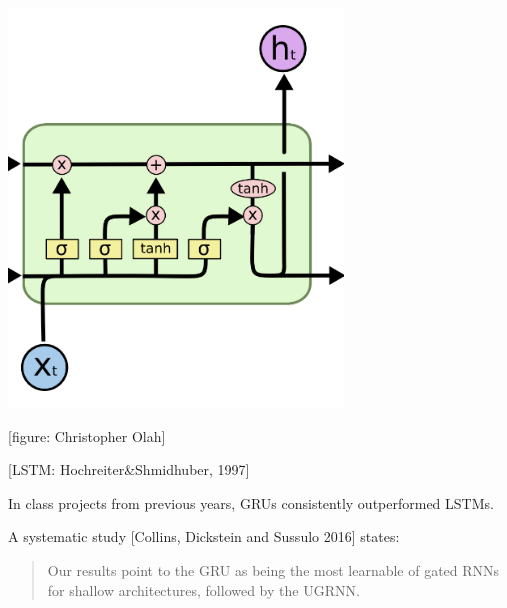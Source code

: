 {
\centerline{\includegraphics[width=3.5in]{../images/LSTM}}
\centerline{{\large [figure: Christopher Olah]}}

\centerline{\Large [LSTM: Hochreiter\&Shmidhuber, 1997]}


\vfill
In class projects from previous years, GRUs consistently outperformed LSTMs.

\vfill
A systematic study [Collins, Dickstein and Sussulo 2016] states:

\begin{quotation}
  Our results point to the GRU as being the most learnable of gated RNNs for shallow architectures, followed by the UGRNN.
\end{quotation}


}

